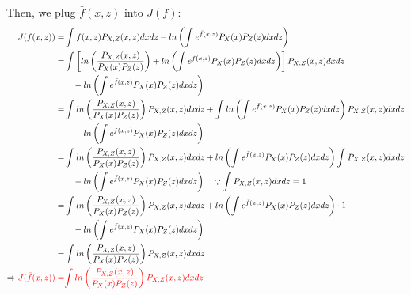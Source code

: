 \documentclass[UTF8]{article}
\begin{document}
Then, we plug $\bar{f}(x,z)$ into $J(f)$:
\begin{equation}
    \begin{split}
        J(\bar{f}(x,z))  = & \int_{}^{}\bar{f}(x,z)P_{X,Z}(x,z)dxdz - ln\left(  \int_{}^{} e^{\bar{f}(x,z)}P_X(x)P_Z(z)dxdz \right) \\
        = & \int_{}^{}\left[ ln \left( \frac{P_{X,Z}(x,z) }{P_X(x)P_Z(z)} \right) + ln\left(\int_{}^{}e^{ \bar{f}(x,z) }P_X(x)P_Z(z)dxdz  \right)  \right] P_{X,Z}(x,z)dxdz \\
        & \quad - ln\left(  \int_{}^{} e^{\bar{f}(x,z)}P_X(x)P_Z(z)dxdz \right) \\
        = & \int_{}^{} ln \left( \frac{P_{X,Z}(x,z) }{P_X(x)P_Z(z)} \right)P_{X,Z}(x,z)dxdz + \int_{}^{} ln\left(\int_{}^{}e^{ \bar{f}(x,z) }P_X(x)P_Z(z)dxdz  \right) P_{X,Z}(x,z)dxdz  \\
        & \quad - ln\left(  \int_{}^{} e^{\bar{f}(x,z)}P_X(x)P_Z(z)dxdz \right) \\
        = & \int_{}^{} ln \left( \frac{P_{X,Z}(x,z) }{P_X(x)P_Z(z)} \right)P_{X,Z}(x,z)dxdz + ln\left(\int_{}^{}e^{ \bar{f}(x,z) }P_X(x)P_Z(z)dxdz  \right) \int_{}^{} P_{X,Z}(x,z)dxdz  \\
        & \quad - ln\left(  \int_{}^{} e^{\bar{f}(x,z)}P_X(x)P_Z(z)dxdz \right) \quad \because \int_{}^{}   P_{X,Z}(x,z)dxdz = 1 \\
        = & \int_{}^{} ln \left( \frac{P_{X,Z}(x,z) }{P_X(x)P_Z(z)} \right)P_{X,Z}(x,z)dxdz + ln\left(\int_{}^{}e^{ \bar{f}(x,z) }P_X(x)P_Z(z)dxdz  \right) \cdot 1 \\
        & \quad - ln\left(  \int_{}^{} e^{\bar{f}(x,z)}P_X(x)P_Z(z)dxdz \right) \\
        = & \int_{}^{} ln \left( \frac{P_{X,Z}(x,z) }{P_X(x)P_Z(z)} \right)P_{X,Z}(x,z)dxdz  \\
        \Rightarrow \textcolor{red}{  J(\bar{f}(x,z)) = } & \textcolor{red}{ \int_{}^{} ln \left( \frac{P_{X,Z}(x,z) }{P_X(x)P_Z(z)} \right)P_{X,Z}(x,z)dxdz}
    \end{split}
\end{equation}
\end{document}
